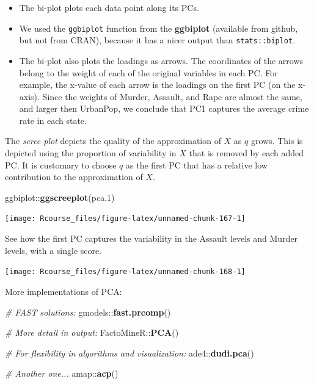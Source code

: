 \documentclass[]{book}
\newenvironment{Shaded}{\begin{snugshade}}{\end{snugshade}}
\newcommand{\KeywordTok}[1]{\textcolor[rgb]{0.13,0.29,0.53}{\textbf{{#1}}}}
\newcommand{\FloatTok}[1]{\textcolor[rgb]{0.00,0.00,0.81}{{#1}}}
\newcommand{\CommentTok}[1]{\textcolor[rgb]{0.56,0.35,0.01}{\textit{{#1}}}}
\newcommand{\NormalTok}[1]{{#1}}
\providecommand{\tightlist}{%
  \setlength{\itemsep}{0pt}\setlength{\parskip}{0pt}}
\theoremstyle{definition}
\theoremstyle{definition}
\theoremstyle{remark}
\begin{document}
\begin{itemize}
\tightlist
\item
  The bi-plot plots each data point along its PCs.
\item
  We used the \texttt{ggbiplot} function from the \textbf{ggbiplot}
  (available from github, but not from CRAN), because it has a nicer
  output than \texttt{stats::biplot}.
\item
  The bi-plot also plots the loadings as arrows. The coordinates of the
  arrows belong to the weight of each of the original variables in each
  PC. For example, the x-value of each arrow is the loadings on the
  first PC (on the x-axis). Since the weights of Murder, Assault, and
  Rape are almost the same, and larger then UrbanPop, we conclude that
  PC1 captures the average crime rate in each state.
\end{itemize}

The \emph{scree plot} depicts the quality of the approximation of \(X\)
as \(q\) grows. This is depicted using the proportion of variability in
\(X\) that is removed by each added PC. It is customary to choose \(q\)
as the first PC that has a relative low contribution to the
approximation of \(X\).

\begin{Shaded}
\begin{Highlighting}[]
\NormalTok{ggbiplot::}\KeywordTok{ggscreeplot}\NormalTok{(pca}\FloatTok{.1}\NormalTok{)}
\end{Highlighting}
\end{Shaded}

\texttt{[image: Rcourse\_files/figure-latex/unnamed-chunk-167-1]}

See how the first PC captures the variability in the Assault levels and
Murder levels, with a single score.

\texttt{[image: Rcourse\_files/figure-latex/unnamed-chunk-168-1]}

More implementations of PCA:

\begin{Shaded}
\begin{Highlighting}[]
\CommentTok{# FAST solutions:}
\NormalTok{gmodels::}\KeywordTok{fast.prcomp}\NormalTok{()}

\CommentTok{# More detail in output:}
\NormalTok{FactoMineR::}\KeywordTok{PCA}\NormalTok{()}

\CommentTok{# For flexibility in algorithms and visualization:}
\NormalTok{ade4::}\KeywordTok{dudi.pca}\NormalTok{()}

\CommentTok{# Another one...}
\NormalTok{amap::}\KeywordTok{acp}\NormalTok{()}
\end{Highlighting}
\end{Shaded}
\end{document}
